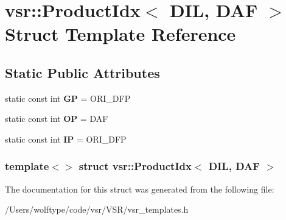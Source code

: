 \hypertarget{structvsr_1_1_product_idx_3_01_d_i_l_00_01_d_a_f_01_4}{\section{vsr\-:\-:Product\-Idx$<$ D\-I\-L, D\-A\-F $>$ Struct Template Reference}
\label{structvsr_1_1_product_idx_3_01_d_i_l_00_01_d_a_f_01_4}
}
\subsection*{Static Public Attributes}
\begin{DoxyCompactItemize}
\item 
\hypertarget{structvsr_1_1_product_idx_3_01_d_i_l_00_01_d_a_f_01_4_a6aa0b8259295608e2195ee5f1e207810}{static const int {\bfseries G\-P} = O\-R\-I\-\_\-\-D\-F\-P}\label{structvsr_1_1_product_idx_3_01_d_i_l_00_01_d_a_f_01_4_a6aa0b8259295608e2195ee5f1e207810}

\item 
\hypertarget{structvsr_1_1_product_idx_3_01_d_i_l_00_01_d_a_f_01_4_a37f69fb9bd0867a7e4443caca5aba2b3}{static const int {\bfseries O\-P} = D\-A\-F}\label{structvsr_1_1_product_idx_3_01_d_i_l_00_01_d_a_f_01_4_a37f69fb9bd0867a7e4443caca5aba2b3}

\item 
\hypertarget{structvsr_1_1_product_idx_3_01_d_i_l_00_01_d_a_f_01_4_a578eb985e4055f586b70c6d7e8600f67}{static const int {\bfseries I\-P} = O\-R\-I\-\_\-\-D\-F\-P}\label{structvsr_1_1_product_idx_3_01_d_i_l_00_01_d_a_f_01_4_a578eb985e4055f586b70c6d7e8600f67}

\end{DoxyCompactItemize}
\subsubsection*{template$<$$>$ struct vsr\-::\-Product\-Idx$<$ D\-I\-L, D\-A\-F $>$}



The documentation for this struct was generated from the following file\-:\begin{DoxyCompactItemize}
\item 
/\-Users/wolftype/code/vsr/\-V\-S\-R/vsr\-\_\-templates.\-h\end{DoxyCompactItemize}
